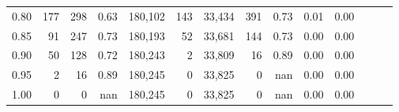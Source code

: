 \begin{tabular}{rrrrrrrrrrrrrr}
0.80 &     177 &    298 &  0.63 &  180,102 &      143 &  33,434 &     391 &  0.73 &  0.01 &      0.00 \\
0.85 &      91 &    247 &  0.73 &  180,193 &       52 &  33,681 &     144 &  0.73 &  0.00 &      0.00 \\
0.90 &      50 &    128 &  0.72 &  180,243 &        2 &  33,809 &      16 &  0.89 &  0.00 &      0.00 \\
0.95 &       2 &     16 &  0.89 &  180,245 &        0 &  33,825 &       0 &   nan &  0.00 &      0.00 \\
1.00 &       0 &      0 &   nan &  180,245 &        0 &  33,825 &       0 &   nan &  0.00 &      0.00 \\
\bottomrule
\end{tabular}
